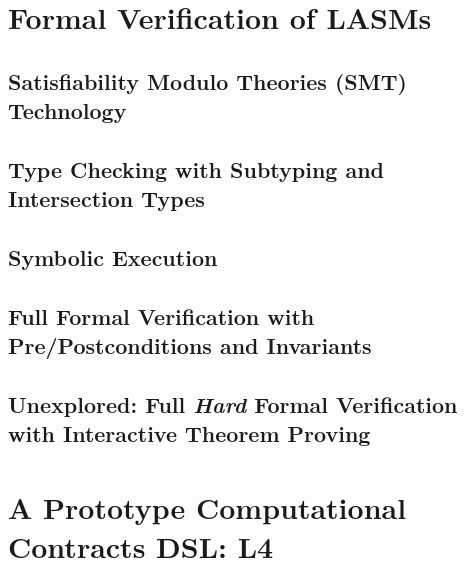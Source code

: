 \documentclass[12pt]{article}
\newcommand{\lasms}{{\sf LASM}s\xspace}
\begin{document}
\section{Formal Verification of \lasms} \label{static}

\subsection{Satisfiability Modulo Theories (SMT) Technology}

\subsection{Type Checking with Subtyping and Intersection Types}

\subsection{Symbolic Execution}

\subsection{Full Formal Verification with Pre/Postconditions and Invariants}

\subsection{Unexplored: Full {\it Hard} Formal Verification with Interactive Theorem Proving}

\section{A Prototype Computational Contracts DSL: L4}

 
\end{document}
